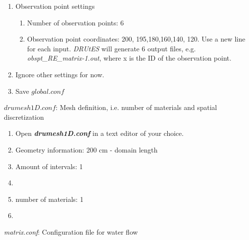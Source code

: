 \begin{enumerate}
\item Observation point settings \begin{enumerate}
\item Number of observation points: 6 
\item Observation point coordinates: 200, 195,180,160,140, 120. Use a new line for each input. \textit{DRUtES} will generate 6 output files, e.g. \textit{obspt\_RE\_matrix-1.out}, where x is the ID of the observation point. 
\end{enumerate}
\item Ignore other settings for now. 
\item Save $global.conf$
\end{enumerate}


$drumesh1D.conf$: Mesh definition, i.e. number of materials and spatial discretization
\begin{enumerate}
\item Open \textbf{\emph{drumesh1D.conf}} in a text editor of your choice. 
\item Geometry information: 200 cm - domain length
\item Amount of intervals: 1
\item
{}
\item number of materials: 1
\item {}
\end{enumerate}

\emph{matrix.conf}: Configuration file for water flow 


